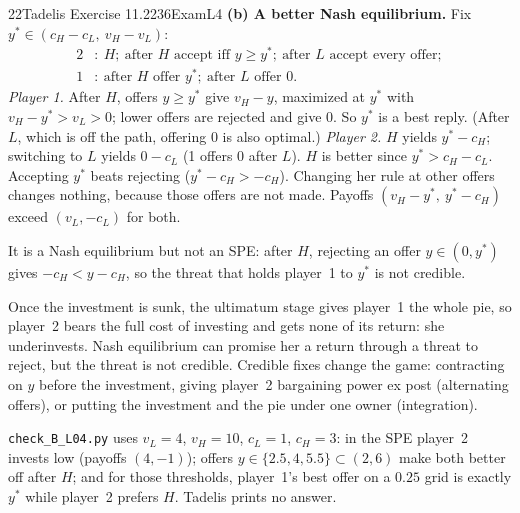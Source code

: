 \begin{exsol}{22}{Tadelis Exercise 11.2}{236}{Exam}{L4}
\textbf{(b) A better Nash equilibrium.} Fix $y^* \in (c_H - c_L,\ v_H - v_L)$:
\begin{align*}
  \text{2}&:\ H;\ \text{after } H \text{ accept iff } y \ge y^*;\ \text{after } L \text{ accept
  every offer};\\
  \text{1}&:\ \text{after } H \text{ offer } y^*;\ \text{after } L \text{ offer } 0 .
\end{align*}
\emph{Player 1.} After $H$, offers $y \ge y^*$ give $v_H - y$, maximized at $y^*$ with
$v_H - y^* > v_L > 0$; lower offers are rejected and give $0$. So $y^*$ is a best reply. (After $L$,
which is off the path, offering 0 is also optimal.)
\emph{Player 2.} $H$ yields $y^* - c_H$; switching to $L$ yields $0 - c_L$ (1 offers 0 after $L$).
$H$ is better since $y^* > c_H - c_L$. Accepting $y^*$ beats rejecting ($y^* - c_H > -c_H$).
Changing her rule at other offers changes nothing, because those offers are not made.
Payoffs $(v_H - y^*,\ y^* - c_H)$ exceed $(v_L, -c_L)$ for both.

It is a Nash equilibrium but not an SPE: after $H$, rejecting an offer $y \in (0, y^*)$ gives
$-c_H < y - c_H$, so the threat that holds player~1 to $y^*$ is not credible.

\interp Once the investment is sunk, the ultimatum stage gives player~1 the whole pie, so
player~2 bears the full cost of investing and gets none of its return: she underinvests. Nash
equilibrium can promise her a return through a threat to reject, but the threat is not credible.
Credible fixes change the game: contracting on $y$ before the investment, giving player~2
bargaining power ex post (alternating offers), or putting the investment and the pie under one
owner (integration).

\verify \texttt{check\_B\_L04.py} uses $v_L = 4$, $v_H = 10$, $c_L = 1$, $c_H = 3$: in the SPE
player~2 invests low (payoffs $(4,-1)$); offers $y \in \{2.5, 4, 5.5\} \subset (2, 6)$ make both
better off after $H$; and for those thresholds, player~1's best offer on a $0.25$ grid is exactly
$y^*$ while player~2 prefers $H$. Tadelis prints no answer.

\end{exsol}
